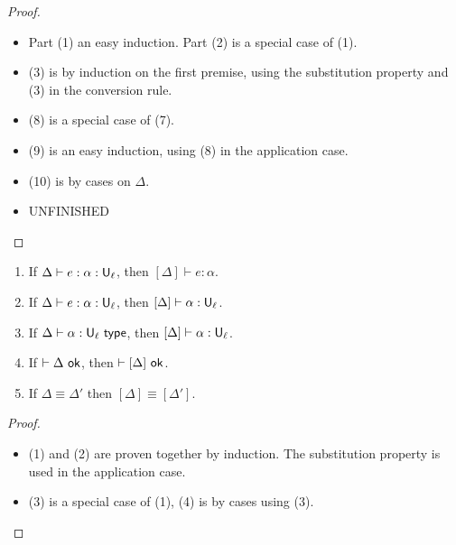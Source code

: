 \begin{proof}\ \\[-7mm]
\begin{itemize}
\item Part (1) an easy induction. Part (2) is a special case of (1).
\item (3) is by induction on the first premise, using the substitution property and (3) in the conversion rule.
\item (8) is a special case of (7).
\item (9) is an easy induction, using (8) in the application case.
\item (10) is by cases on $\Delta$.
\item UNFINISHED
\end{itemize}
\end{proof}

\begin{lemma}
\begin{enumerate}
\item If $\Delta\vdash e:\alpha:\U_\ell$, then $[\Delta]\vdash e:\alpha$.
\item If $\Delta\vdash e:\alpha:\U_\ell$, then $[\Delta]\vdash \alpha:\U_\ell$.
\item If $\Delta\vdash \alpha:\U_\ell\type$, then $[\Delta]\vdash \alpha:\U_\ell$.
\item If $\vdash\Delta\ok$, then $\vdash[\Delta]\ok$.
\item If $\Delta\equiv\Delta'$ then $[\Delta]\equiv[\Delta']$.
\end{enumerate}
\end{lemma}
\begin{proof}\ \\[-7mm]
\begin{itemize}
\item (1) and (2) are proven together by induction. The substitution property is used in the application case.
\item (3) is a special case of (1), (4) is by cases using (3).
\end{itemize}
\end{proof}


